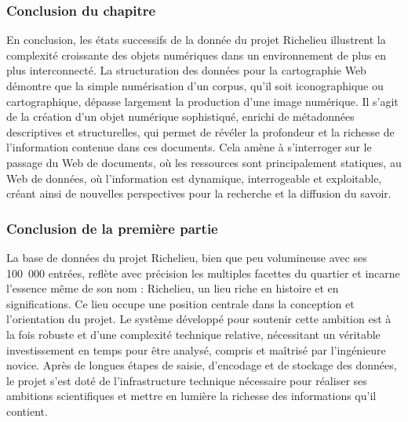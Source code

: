 \subsubsection{Conclusion du chapitre} 
En conclusion, les états successifs de la donnée du projet Richelieu illustrent la complexité croissante des objets numériques dans un environnement de plus en plus interconnecté. La structuration des données pour la cartographie Web démontre que la simple numérisation d’un corpus, qu’il soit iconographique ou cartographique, dépasse largement la production d’une image numérique. Il s'agit de la création d’un objet numérique sophistiqué, enrichi de métadonnées descriptives et structurelles, qui permet de révéler la profondeur et la richesse de l’information contenue dans ces documents. Cela amène à s'interroger sur le passage du Web de documents, où les ressources sont principalement statiques, au Web de données, où l'information est dynamique, interrogeable et exploitable, créant ainsi de nouvelles perspectives pour la recherche et la diffusion du savoir.

\subsubsection{Conclusion de la première partie} 
La base de données du projet Richelieu, bien que peu volumineuse avec ses 100~000 entrées, reflète avec précision les multiples facettes du quartier et incarne l'essence même de son nom : Richelieu, un lieu riche en histoire et en significations. Ce lieu occupe une position centrale dans la conception et l'orientation du projet. Le système développé pour soutenir cette ambition est à la fois robuste et d'une complexité technique relative, nécessitant un véritable investissement en temps pour être analysé, compris et maîtrisé par l'ingénieure novice. Après de longues étapes de saisie, d'encodage et de stockage des données, le projet s’est doté de l’infrastructure technique nécessaire pour réaliser ses ambitions scientifiques et mettre en lumière la richesse des informations qu’il contient.